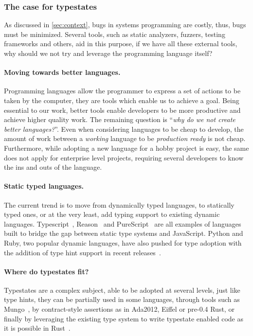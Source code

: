 \subsubsection*{The case for typestates}

As discussed in \autoref{sec:context}, bugs in systems programming are costly,
thus, bugs must be minimized.
Several tools, such as static analyzers, fuzzers, testing frameworks and others,
aid in this purpose, if we have all these external tools,
why should we not try and leverage the programming language itself?

\paragraph{Moving towards better languages.}
Programming languages allow the programmer to express a set of actions to be taken by the computer,
they are tools which enable us to achieve a goal.
Being essential to our work, better tools enable developers to be more productive and achieve higher quality work.
The remaining question is “\emph{why do we not create better languages?}”.
Even when considering languages to be cheap to develop,
the amount of work between a \emph{working} language to be \emph{production ready} is not cheap.
Furthermore, while adopting a new language for a hobby project is easy,
the same does not apply for enterprise level projects,
requiring several developers to know the ins and outs of the language.

\paragraph{Static typed languages.}
The current trend is to move from dynamically typed languages,
to statically typed ones, or at the very least, add typing support to existing dynamic languages.
Typescript~\autocite{typescript},
Reason~\autocite{reason} and
PureScript~\autocite{purescript}
are all examples of languages built to bridge the gap between static type systems and JavaScript.
Python and Ruby, two popular dynamic languages, have also pushed for type adoption
with the addition of type hint support in recent
releases~\autocite{PythonTyping, RubyRBS}.

\paragraph{Where do typestates fit?}
Typestates are a complex subject, able to be adopted at several levels,
just like type hints, they can be partially used in some languages,
through tools such as Mungo~\autocite{Voinea2020},
by contract-style assertions as in Ada2012, Eiffel or pre-0.4 Rust,
or finally by leveraging the existing type system to write typestate enabled code as it is possible in
Rust~\autocite{Duarte2020}.

